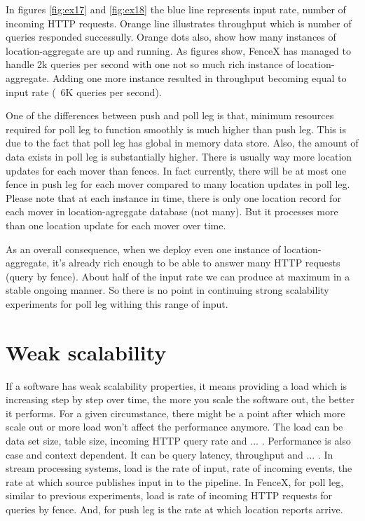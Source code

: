 \documentclass[a4]{report}
\begin{document}
    In figures \ref{fig:ex17} and \ref{fig:ex18} the blue line represents input rate, number of incoming HTTP
    requests.
    Orange line illustrates throughput which is number of queries responded successully.
    Orange dots also, show how many instances of location-aggregate are up and running.
    As figures show, FenceX has managed to handle 2k queries
    per second with one not so much rich instance of location-aggregate.
    Adding one more instance resulted in throughput becoming equal to input rate (~6K queries per second).

    One of the differences between push and poll leg is that, minimum resources required for poll leg to function
    smoothly is much higher than push leg.
    This is due to the fact that poll leg has global in memory data store.
    Also, the amount of data exists in poll leg is substantially higher.
    There is usually way more location updates for each mover than fences.
    In fact currently, there will be at most one fence in push leg for each mover compared to many location updates
    in poll leg.
    Please note that at each instance in time, there is only one location record for each mover in location-agreggate
    database (not many).
    But it processes more than one location update for each mover over time.

    As an overall consequence, when we deploy even one instance of location-aggregate, it's already rich enough to be
    able to answer many HTTP requests (query by fence).
    About half of the input rate we can produce at maximum in a stable ongoing manner.
    So there is no point in continuing strong scalability experiments for poll leg withing this range of input.


    \section{Weak scalability}
    If a software has weak scalability properties, it means providing a load which is increasing step by step over
    time, the more you scale the software out, the better it performs.
    For a given circumstance, there might be a point after which more scale out or more load won't affect
    the performance anymore.
    The load can be data set size, table size, incoming HTTP query rate and ... .
    Performance is also case and context dependent.
    It can be query latency, throughput and ... .
    In stream processing systems, load is the rate of input, rate of incoming events, the rate at
    which source publishes input in to the pipeline.
    In FenceX, for poll leg, similar to previous experiments, load is rate of incoming HTTP requests for queries by
    fence.
    And, for push leg is the rate at which location reports arrive.
\end{document}
